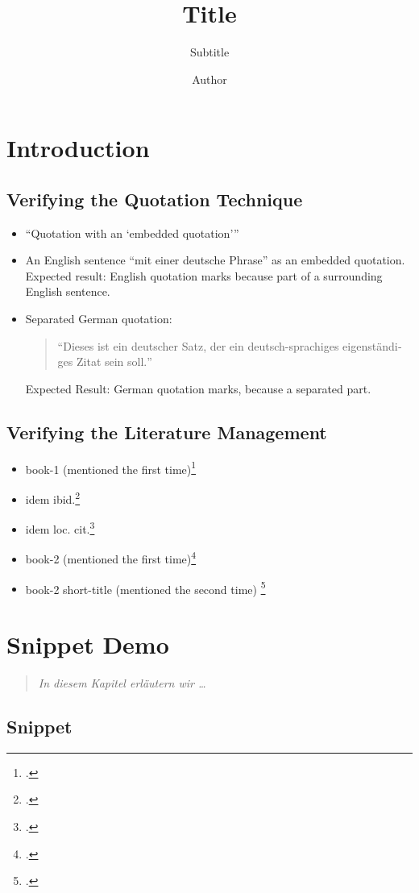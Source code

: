 \documentclass[
  DIV=calc,
  BCOR=5mm,
  11pt,
  headings=small,
  oneside,
  abstract=true,
  toc=bib,
  ngerman,english]{scrbook}
\begin{document}
\nocite{*}

\titlehead{Classification}
\subject{Release }
\title{Title}
\subtitle{Subtitle}
\author{Author}

\maketitle

\chapter{Introduction}

\section{Verifying the Quotation Technique}


\begin{itemize}

  \item \enquote{Quotation with an \enquote{embedded quotation}}

  \item An English sentence \foreignquote{english}{mit einer deutsche Phrase} as an embedded quotation. Expected result: English quotation marks because part of a surrounding English sentence.

  \item Separated German quotation:
  \begin{quote}
    \foreignquote{german}{Dieses ist ein deutscher Satz, der ein deutsch-sprachiges eigenständiges Zitat sein soll.}
  \end{quote}
  Expected Result: German quotation marks, because a separated part.
\end{itemize}

\section{Verifying the Literature Management}
\begin{itemize}
  \item book-1 (mentioned the first time)\footcite[vgl.][15]{KantKdrV1974}
  \item idem ibid.\footcite[vgl.][15]{KantKdrV1974}
  \item idem loc. cit.\footcite[vgl.][23]{KantKdrV1974}
  \item book-2 (mentioned  the first time)\footcite[vgl.][15]{KantKdU1974}
  \item book-2 short-title (mentioned the second time) \footcite[vgl.][15]{KantKdrV1974}
\end{itemize}

\chapter{Snippet Demo}
\begin{quote}\itshape
In diesem Kapitel erläutern wir \ldots
\end{quote}

\section{Snippet}






\printnomenclature
\printbibliography
\end{document}

